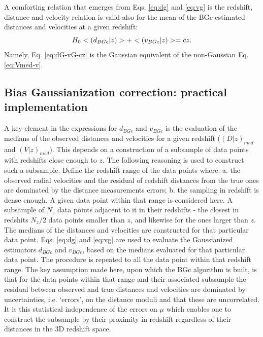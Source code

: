 \documentclass[useAMS,usenatbib]{mn2e}
\begin{document}
A comforting relation that emerges from Eqs. \ref{eq:dg}   and \ref{eq:vg} is the redshift, distance and velocity relation is valid also for the mean of the BGc estimated distances and velocities at a given redshift:
\begin{equation}
H_0 \large<  (d_{BGc}\vert z) \large>  + \large< (v_{BGc} \vert z) \large> =  cz.
\label{eq:dG-vG-cz}
\end{equation}
Namely, Eq. \ref{eq:dG-vG-cz} is the Gaussian equivalent of the non-Gaussian Eq. \ref{eq:Vmed-v}.


  
\subsection{Bias Gaussianization correction: practical implementation}
 \label{subsec:BGc}
 

A key  element in the  expressions for $d_{BGc}$ and $v_{BGc}$ is the evaluation of the medians of the observed distances and velocities for a given  redshift ($(D\vert z)_{med}$ and $(V\vert z)_{med}$). This depends on a construction  of a subsample of data points with redshifts close enough to  $z$.    The following reasoning is used to construct such a subsample. Define  the redshift  range  of the data points   where: a.  the observed radial velocities and the residual of redshift distances from the true ones are dominated by the distance measurements errors; b.   the sampling in redshift  is dense enough. A given data point within that range is considered here.   A subsample of $N_z$  data points adjacent to it in their redshifts - the closest in redshits $N_z/2$ data points smaller than $z$, and likewise for the ones larger than $z$. The medians of the distances and velocities are constructed for that particular data point. Eqs. \ref{eq:dg} and \ref{eq:vg} are  used to evaluate  the Gaussianized estimators $d_{BGc}$ and $v_{BGc}$, based on the medians evaluated for that particular data point. The procedure is repeated to all the data point  within that  redshift range. The key assumption made here, upon which the BGc algorithm is built, is that for the data points within that range and their associated subsample  the residual between observed and true distances and velocities are dominated by  uncertainties, i.e. `errors', on the distance moduli and that these are uncorrelated. It is this statistical independence of the errors on $\mu$ which enables one to construct the subsample by their proximity in redshift regardless of their distances in the 3D redshift space.
\end{document}
